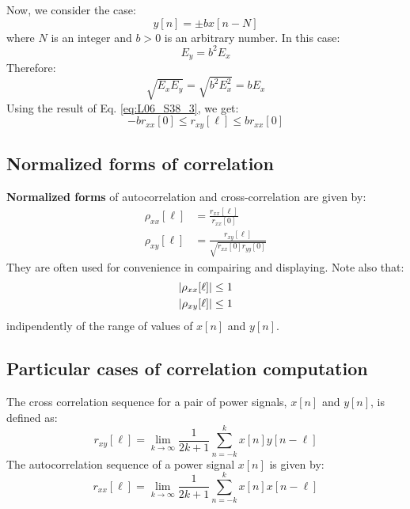 \documentclass[../../main/main.tex]{subfiles}
\begin{document}
Now, we consider the case:
\begin{equation}
    y[n]
    =
    \pm b x[n-N]
    \label{eq:L06_S40_1}
\end{equation}
where \( N \) is an integer and \( b > 0 \) is an arbitrary number. In this case:
\begin{equation}
    E_{y}
    =
    b^{2} E_{x}
    \label{eq:L06_S40_2}
\end{equation}
Therefore:
\begin{equation}
    \sqrt{E_{x} E_{y}}
    =
    \sqrt{b^{2} E^{2}_{x}}
    =
    b E_{x}
    \label{eq:L06_S41_1}
\end{equation}
Using the result of Eq. \ref{eq:L06_S38_3}, we get:
\begin{equation}
    -b r_{xx}[0]
    \le
    r_{xy}[\ell]
    \le
    b r_{xx}[0]
    \label{eq:L06_S41_3}
\end{equation}



\subsection{Normalized forms of correlation}
\textbf{Normalized forms} of autocorrelation and cross-correlation are given by:
\begin{align}
    \rho_{xx}[\ell] &= \frac{r_{xx}[\ell]}{r_{xx}[0]} \\
    \rho_{xy}[\ell] &= \frac{r_{xy}[\ell]}{\sqrt{r_{xx}[0] r_{yy}[0]}}
\end{align}
They are often used for convenience in compairing and displaying. Note also that:
\begin{align}
    \abs{\rho_{xx}[\ell]} &\le 1    \\
    \abs{\rho_{xy}[\ell]} &\le 1
\end{align}
indipendently of the range of values of \( x[n] \) and \( y[n] \).



\subsection{Particular cases of correlation computation}
The cross correlation sequence for a pair of power signals, \( x[n] \) and \( y[n] \), is defined as:
\begin{equation}
    r_{xy}[\ell]
    =
    \lim_{k \to \infty} \frac{1}{2k + 1} \sum_{n=-k}^{k} x[n]y[n-\ell]
    \label{eq:L06_S43_1}
\end{equation}
The autocorrelation sequence of a power signal \( x[n] \) is given by:
\begin{equation}
    r_{xx}[\ell]
    =
    \lim_{k \to \infty} \frac{1}{2k + 1} \sum_{n=-k}^{k} x[n]x[n-\ell]
    \label{eq:L06_S43_2}
\end{equation}
\end{document}
